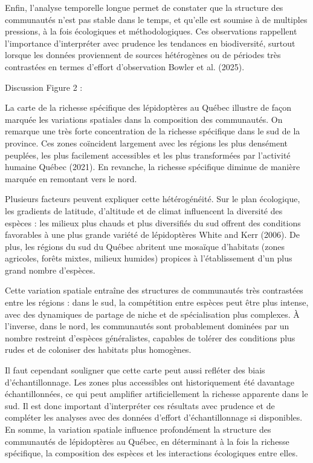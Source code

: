 \documentclass[9pt,twocolumn,twoside,]{pnas-new}
\begin{document}
Enfin, l'analyse temporelle longue permet de constater que la structure
des communautés n'est pas stable dans le temps, et qu'elle est soumise à
de multiples pressions, à la fois écologiques et méthodologiques. Ces
observations rappellent l'importance d'interpréter avec prudence les
tendances en biodiversité, surtout lorsque les données proviennent de
sources hétérogènes ou de périodes très contrastées en termes d'effort
d'observation Bowler et al. (2025).

Discussion Figure 2 :

La carte de la richesse spécifique des lépidoptères au Québec illustre
de façon marquée les variations spatiales dans la composition des
communautés. On remarque une très forte concentration de la richesse
spécifique dans le sud de la province. Ces zones coïncident largement
avec les régions les plus densément peuplées, les plus facilement
accessibles et les plus transformées par l'activité humaine Québec
(2021). En revanche, la richesse spécifique diminue de manière marquée
en remontant vers le nord.

Plusieurs facteurs peuvent expliquer cette hétérogénéité. Sur le plan
écologique, les gradients de latitude, d'altitude et de climat
influencent la diversité des espèces : les milieux plus chauds et plus
diversifiés du sud offrent des conditions favorables à une plus grande
variété de lépidoptères White and Kerr (2006). De plus, les régions du
sud du Québec abritent une mosaïque d'habitats (zones agricoles, forêts
mixtes, milieux humides) propices à l'établissement d'un plus grand
nombre d'espèces.

Cette variation spatiale entraîne des structures de communautés très
contrastées entre les régions : dans le sud, la compétition entre
espèces peut être plus intense, avec des dynamiques de partage de niche
et de spécialisation plus complexes. À l'inverse, dans le nord, les
communautés sont probablement dominées par un nombre restreint d'espèces
généralistes, capables de tolérer des conditions plus rudes et de
coloniser des habitats plus homogènes.

Il faut cependant souligner que cette carte peut aussi refléter des
biais d'échantillonnage. Les zones plus accessibles ont historiquement
été davantage échantillonnées, ce qui peut amplifier artificiellement la
richesse apparente dans le sud. Il est donc important d'interpréter ces
résultats avec prudence et de compléter les analyses avec des données
d'effort d'échantillonnage si disponibles. En somme, la variation
spatiale influence profondément la structure des communautés de
lépidoptères au Québec, en déterminant à la fois la richesse spécifique,
la composition des espèces et les interactions écologiques entre elles.
\end{document}
